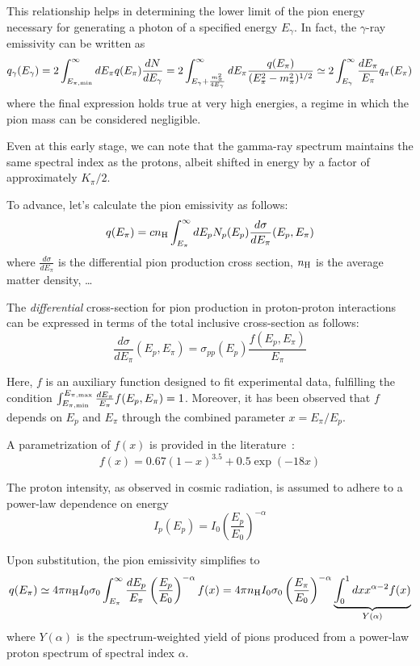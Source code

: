 This relationship helps in determining the lower limit of the pion energy necessary for generating a photon of a specified energy \( E_\gamma \). In fact, the $\gamma$-ray emissivity can be written as
%
\[
q_\gamma(E_\gamma) = 2 \int_{E_{\rm \pi, min}}^\infty dE_\pi q(E_\pi) \frac{dN}{dE_\gamma} = 
2 \int_{E_\gamma + \frac{m_\pi^2}{4 E_\gamma}}^\infty dE_\pi \frac{q(E_\pi)}{(E_\pi^2 - m_\pi^2)^{1/2}} \simeq 2 \int_{E_\gamma}^\infty \frac{dE_\pi}{E_\pi} q_\pi(E_\pi)
\]
%
where the final expression holds true at very high energies, a regime in which the pion mass can be considered negligible.

Even at this early stage, we can note that the gamma-ray spectrum maintains the same spectral index as the protons, albeit shifted in energy by a factor of approximately \( K_\pi / 2 \).

To advance, let's calculate the pion emissivity as follows:
%
\[
q(E_\pi) = c n_{\rm H} \int_{E_\pi}^\infty dE_p N_p (E_p) \frac{d\sigma}{dE_\pi}(E_p, E_\pi)
\]
%
where $\frac{d\sigma}{dE_\pi}$ is the differential pion production cross section, $n_{\rm H}$ is the average matter density, \dots

The \emph{differential} cross-section for pion production in proton-proton interactions can be expressed in terms of the total inclusive cross-section as follows:
%
\[
\frac{d\sigma}{dE_\pi}(E_p, E_\pi) = \sigma_{pp}(E_p) \frac{f(E_p, E_\pi)}{E_\pi}
\]

Here, \(f\) is an auxiliary function designed to fit experimental data, fulfilling the condition $\int_{E_{\rm \pi,min}}^{E_{\rm \pi,max}} \frac{dE_\pi}{E_\pi} f(E_p, E_\pi) = 1$. 
%
Moreover, it has been observed that $f$ depends on \(E_p\) and \(E_\pi\) through the combined parameter \(x = E_\pi / E_p\). 

A parametrization of \(f(x)\) is provided in the literature~\cite{Cavasinni2006aph}:
%
\[
f(x) = 0.67 (1-x)^{3.5} + 0.5 \exp(-18 x)
\]

The proton intensity, as observed in cosmic radiation, is assumed to adhere to a power-law dependence on energy
%
\[
I_p(E_p) = I_0 \left(\frac{E_p}{E_0}\right)^{-\alpha}
\]

Upon substitution, the pion emissivity simplifies to
%
 \[
q(E_\pi) \simeq 4 \pi n_{\rm H} I_0 \sigma_0 \int_{E_\pi}^\infty \frac{dE_p}{E_\pi} \left(\frac{E_p}{E_0} \right)^{-\alpha} f(x) = 4 \pi n_{\rm H} I_0 \sigma_0 \left(\frac{E_\pi}{E_0} \right)^{-\alpha} \underbrace{ \int_0^1 dx x^{\alpha-2} f(x)}_{Y(\alpha)}
\]
%
where $Y(\alpha)$ is the spectrum-weighted yield of pions produced from a power-law proton spectrum of spectral index $\alpha$.

